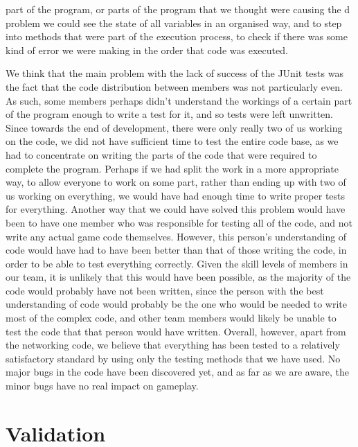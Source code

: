 part of the program, or parts of the program that we thought were causing the d problem we could see the state of all variables in an organised way, and to step into methods that were part of the execution process, to check if there was some kind of error we were making in the order that code was executed.

We think that the main problem with the lack of success of the JUnit tests was the fact that the code distribution between members was not particularly even. As such, some members perhaps didn't understand the workings of a certain part of the program enough to write a test for it, and so tests were left unwritten. Since towards the end of development, there were only really two of us working on the code, we did not have sufficient time to test the entire code base, as we had to concentrate on writing the parts of the code that were required to complete the program. Perhaps if we had split the work in a more appropriate way, to allow everyone to work on some part, rather than ending up with two of us working on everything, we would have had enough time to write proper tests for everything. Another way that we could have solved this problem would have been to have one member who was responsible for testing all of the code, and not write any actual game code themselves. However, this person's understanding of code would have had to have been better than that of those writing the code, in order to be able to test everything correctly. Given the skill levels of members in our team, it is unlikely that this would have been possible, as the majority of the code would probably have not been written, since the person with the best understanding of code would probably be the one who would be needed to write most of the complex code, and other team members would likely be unable to test the code that that person would have written. Overall, however, apart from the networking code, we believe that everything has been tested to a relatively satisfactory standard by using only the testing methods that we have used. No major bugs in the code have been discovered yet, and as far as we are aware, the minor bugs have no real impact on gameplay.
\section{Validation}